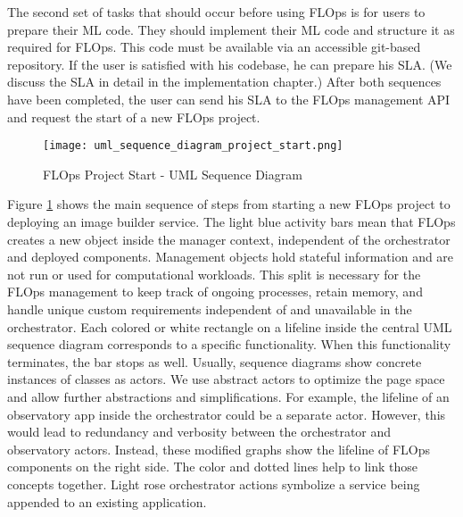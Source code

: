 The second set of tasks that should occur before using FLOps is for users to prepare their ML code.
They should implement their ML code and structure it as required for FLOps.
This code must be available via an accessible git-based repository.
If the user is satisfied with his codebase, he can prepare his SLA.
(We discuss the SLA in detail in the implementation chapter.)
After both sequences have been completed, the user can send his SLA to the FLOps management API and request the start of a new FLOps project.
\vspace{5mm}
\begin{figure}[h]
    \begin{adjustwidth}{-0.2\paperwidth}{-0.2\paperwidth}
        \centering
        \texttt{[image: uml\_sequence\_diagram\_project\_start.png]}
        \caption{FLOps Project Start - UML Sequence Diagram}
        \label{fig:uml_sequence_project_start}
    \end{adjustwidth}
\end{figure}
\newline
Figure \ref{fig:uml_sequence_project_start} shows the main sequence of steps from starting a new FLOps project to deploying an image builder service.
The light blue activity bars mean that FLOps creates a new object inside the manager context, independent of the orchestrator and deployed components.
Management objects hold stateful information and are not run or used for computational workloads.
This split is necessary for the FLOps management to keep track of ongoing processes, retain memory, and handle unique custom requirements independent of and unavailable in the orchestrator.
Each colored or white rectangle on a lifeline inside the central UML sequence diagram corresponds to a specific functionality.
When this functionality terminates, the bar stops as well.
Usually, sequence diagrams show concrete instances of classes as actors.
We use abstract actors to optimize the page space and allow further abstractions and simplifications.
For example, the lifeline of an observatory app inside the orchestrator could be a separate actor.
However, this would lead to redundancy and verbosity between the orchestrator and observatory actors.
Instead, these modified graphs show the lifeline of FLOps components on the right side.
The color and dotted lines help to link those concepts together.
Light rose orchestrator actions symbolize a service being appended to an existing application.

